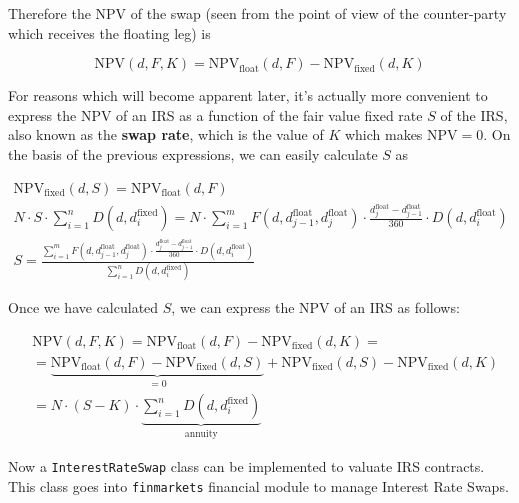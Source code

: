 Therefore the NPV of the swap (seen from the point of view of the counter-party which receives the floating leg) is

\begin{equation}\mathrm{NPV}(d, F, K) = \mathrm{NPV}_{\mathrm{float}}(d, F) - \mathrm{NPV}_{\mathrm{fixed}}(d, K)
\label{eq:irs_npv}
\end{equation}

For reasons which will become apparent later, it's actually more convenient to express the NPV of an IRS as a function of the fair value fixed rate $S$ of the IRS, also known as the \textbf{swap rate}, which is the value of $K$ which makes \(\mathrm{NPV}=0\). On the basis of the previous expressions, we can easily calculate $S$ as

\begin{equation}
\begin{gathered}
\mathrm{NPV}_{\mathrm{fixed}}(d, S) = \mathrm{NPV}_{\mathrm{float}}(d, F)\\[5pt]
N\cdot S\cdot\sum_{i=1}^{n}D(d, d_{i}^{\mathrm{fixed}}) = N\cdot\sum_{i=1}^{m}F(d, d_{j-1}^{\mathrm{float}}, d_{j}^{\mathrm{float}}) \cdot \frac{d_{j}^{\mathrm{float}}-d_{j-1}^{\mathrm{float}}}{360} \cdot D(d, d_{i}^{\mathrm{float}})\\[5pt]
S=\frac{\sum_{i=1}^{m}F(d, d_{j-1}^{\mathrm{float}}, d_{j}^{\mathrm{float}}) \cdot \frac{d_{j}^{\mathrm{float}}-d_{j-1}^{\mathrm{float}}}{360}
\cdot D(d, d_{i}^{\mathrm{float}})}{\sum_{i=1}^{n}D(d, d_i^{\mathrm{fixed}})}
\end{gathered}
\end{equation}

Once we have calculated \(S\), we can express the \(\mathrm{NPV}\) of an IRS as follows:

\begin{equation}
\begin{split}&\mathrm{NPV}(d, F, K) = \mathrm{NPV}_{\mathrm{float}}(d, F) - \mathrm{NPV}_{\mathrm{fixed}}(d, K) = \\ 
&= \underbrace{\mathrm{NPV}_{\mathrm{float}}(d, F) - \mathrm{NPV}_{\mathrm{fixed}}(d, S)}_{\textstyle\mathrm{=0}} + \mathrm{NPV}_{\mathrm{fixed}}(d, S) - \mathrm{NPV}_{\mathrm{fixed}}(d, K) \\ 
& = N\cdot(S-K)\cdot\underbrace{\sum_{i=1}^{n}D(d, d_{i}^{\mathrm{fixed}})}_{\textstyle \mathrm{annuity}}
\end{split}
\label{eq:irs_npv2}
\end{equation}

\begin{finmarkets}
Now a \texttt{InterestRateSwap} class can be implemented to valuate IRS contracts.
This class goes into \texttt{finmarkets} financial module to manage Interest Rate Swaps.
\end{finmarkets}

